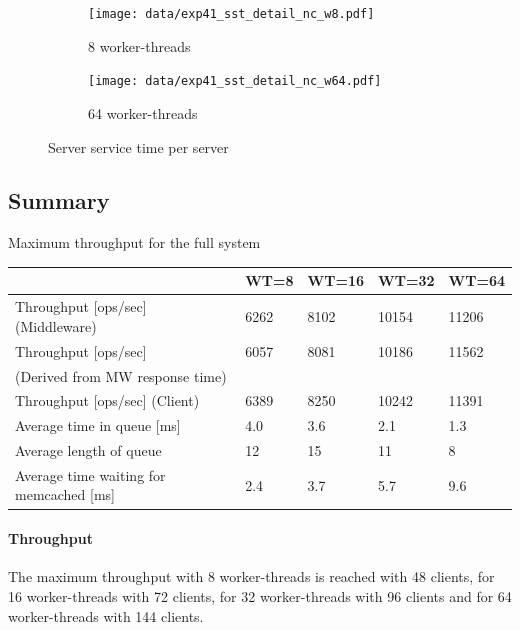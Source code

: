 \documentclass[report.tex]{subfiles}
\begin{document}
\begin{figure}[H]
	\begin{subfigure}[b]{.49\linewidth}
		\centering
		\texttt{[image: data/exp41\_sst\_detail\_nc\_w8.pdf]}
		\caption{8 worker-threads}
	\end{subfigure}\hfill
	\begin{subfigure}[b]{.49\linewidth}
		\centering
		\texttt{[image: data/exp41\_sst\_detail\_nc\_w64.pdf]}
		\caption{64 worker-threads}
	\end{subfigure}%
	\caption{Server service time per server}\label{exp41_sst_detail_nc}
\end{figure}


\subsection{Summary}


\begin{center}
	{Maximum throughput for the full system}
	\begin{tabular}{|l|p{1.5cm}|p{1.5cm}|p{1.5cm}|p{1.5cm}|}
		\hline                                            			& WT=8 & WT=16 & WT=32 & WT=64 \\ 
		\hline Throughput [ops/sec] (Middleware)                    & 6262 &  8102 & 10154 & 11206 \\ 
		\hline Throughput [ops/sec] & 6057 &  8081 & 10186 & 11562 \\ 
		(Derived from MW response time) &  &   &  &  \\ 
		\hline Throughput [ops/sec] (Client)              			& 6389 &  8250 & 10242 & 11391 \\ 
		\hline Average time in queue [ms]                 			&  4.0 &   3.6 &   2.1 &   1.3 \\ 
		\hline Average length of queue                    			&   12 &    15 &    11 &     8 \\ 
		\hline Average time waiting for memcached [ms]    			&  2.4 &   3.7 &   5.7 &   9.6 \\ 
		\hline 
	\end{tabular}
\end{center}

\paragraph{Throughput}
The maximum throughput with 8 worker-threads is reached with 48 clients, for 16 worker-threads with 72 clients, for 32 worker-threads with 96 clients and for 64 worker-threads with 144 clients.
 
\end{document}
